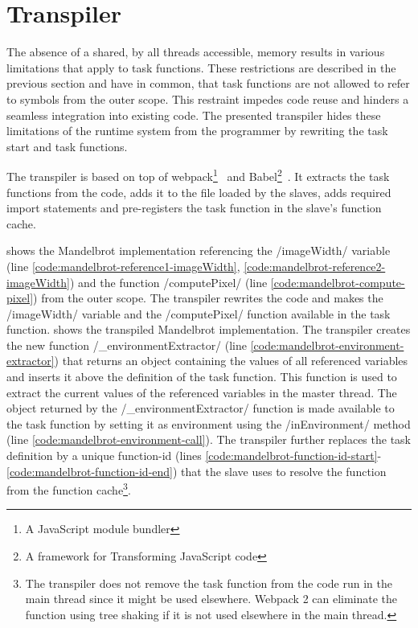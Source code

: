 \section{Transpiler}\label{sec:transpiler}
The absence of a shared, by all threads accessible, memory results in various limitations that apply to task functions. These restrictions are described in the previous section and have in common, that task functions are not allowed to refer to symbols from the outer scope. This restraint impedes code reuse and hinders a seamless integration into existing code. The presented transpiler hides these limitations of the runtime system from the programmer by rewriting the task start and task functions.

The transpiler is based on top of webpack\footnote{A JavaScript module bundler}~\cite{webpack} and Babel\footnote{A framework for Transforming JavaScript code}~\cite{babel}. It extracts the task functions from the code, adds it to the file loaded by the slaves, adds required import statements and pre-registers the task function in the slave's function cache. 

 shows the Mandelbrot implementation referencing the \javascriptinline/imageWidth/ variable (line \ref{code:mandelbrot-reference1-imageWidth}, \ref{code:mandelbrot-reference2-imageWidth}) and the function \javascriptinline/computePixel/ (line \ref{code:mandelbrot-compute-pixel}) from the outer scope. The transpiler rewrites the code and makes the \javascriptinline/imageWidth/ variable and the \javascriptinline/computePixel/ function available in the task function.  shows the transpiled Mandelbrot implementation. The transpiler creates the new function \javascriptinline/_environmentExtractor/ (line \ref{code:mandelbrot-environment-extractor}) that returns an object containing the values of all referenced variables and inserts it above the definition of the task function. This function is used to extract the current values of the referenced variables in the master thread. The object returned by the \javascriptinline/_environmentExtractor/ function is made available to the task function by setting it as environment using the \javascriptinline/inEnvironment/ method (line \ref{code:mandelbrot-environment-call}). The transpiler further replaces the task definition by a unique function-id (lines \ref{code:mandelbrot-function-id-start}-\ref{code:mandelbrot-function-id-end}) that the slave uses to resolve the function from the function cache\footnote{The transpiler does not remove the task function from the code run in the main thread since it might be used elsewhere. Webpack 2 can eliminate the function using tree shaking if it is not used elsewhere in the main thread.}. 


